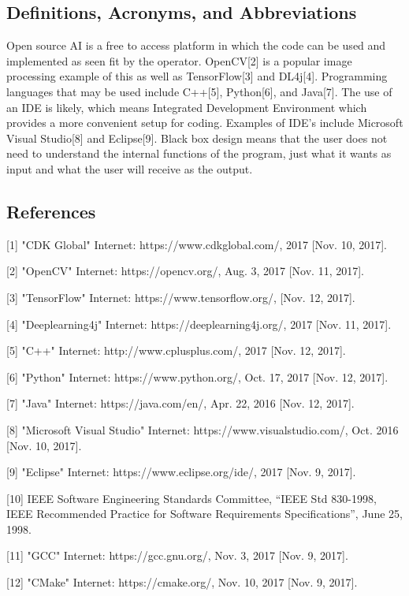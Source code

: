 \documentclass[onecolumn, draftclsnofoot,10pt, compsoc]{IEEEtran}
\begin{document}
\subsection{Definitions, Acronyms, and Abbreviations}
Open source AI is a free to access platform in which the code can be used and implemented as seen fit by the operator. OpenCV[2] is a popular image processing example of this as well as TensorFlow[3] and DL4j[4]. Programming languages that may be used include C++[5], Python[6], and Java[7]. The use of an IDE is likely, which means Integrated Development Environment which provides a more convenient setup for coding. Examples of IDE’s include Microsoft Visual Studio[8] and Eclipse[9]. Black box design means that the user does not need to understand the internal functions of the program, just what it wants as input and what the user will receive as the output. 

\subsection{References}
[1] "CDK Global" Internet: https://www.cdkglobal.com/, 2017 [Nov. 10, 2017].

[2] "OpenCV" Internet: https://opencv.org/, Aug. 3, 2017 [Nov. 11, 2017].

[3] "TensorFlow" Internet: https://www.tensorflow.org/, [Nov. 12, 2017].

[4] "Deeplearning4j" Internet: https://deeplearning4j.org/, 2017 [Nov. 11, 2017].

[5] "C++" Internet: http://www.cplusplus.com/, 2017 [Nov. 12, 2017].

[6] "Python" Internet: https://www.python.org/, Oct. 17, 2017 [Nov. 12, 2017].

[7] "Java" Internet: https://java.com/en/, Apr. 22, 2016 [Nov. 12, 2017].

[8] "Microsoft Visual Studio" Internet: https://www.visualstudio.com/, Oct. 2016 [Nov. 10, 2017].

[9] "Eclipse" Internet: https://www.eclipse.org/ide/, 2017 [Nov. 9, 2017].

[10] IEEE Software Engineering Standards Committee, “IEEE Std 830-1998, IEEE Recommended Practice for Software Requirements Specifications”, June 25, 1998.

[11] "GCC" Internet: https://gcc.gnu.org/, Nov. 3, 2017 [Nov. 9, 2017].

[12] "CMake" Internet: https://cmake.org/, Nov. 10, 2017 [Nov. 9, 2017].
\end{document}
